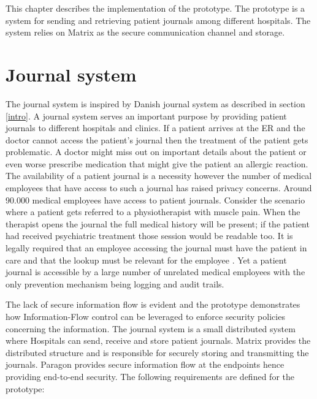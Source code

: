 

This chapter describes the implementation of the prototype. The prototype is a system for sending and retrieving patient journals among different hospitals. The system relies on Matrix as the secure communication channel and storage.


\section{Journal system}


The journal system is inspired by Danish journal system as described in section \ref{intro}. A journal system serves an important purpose by providing patient journals to different hospitals and clinics. If a patient arrives at the ER and the doctor cannot access the patient's journal then the treatment of the patient gets problematic. A doctor might miss out on important details about the patient or even worse prescribe medication that might give the patient an allergic reaction. The availability of a patient journal is a necessity however the number of medical employees that have access to such a journal has raised privacy concerns. Around 90.000 medical employees have access to patient journals. Consider the scenario where a patient gets referred to a physiotherapist with muscle pain. When the therapist opens the journal the full medical history will be present; if the patient had received psychiatric treatment those session would be readable too. It is legally required that an employee accessing the journal must have the patient in care and that the lookup must be relevant for the employee \cite{adgang}\cite{kontrol}. Yet a patient journal is accessible by a large number of unrelated medical employees with the only prevention mechanism being logging and audit trails.


The lack of secure information flow is evident and the prototype demonstrates how Information-Flow control can be leveraged to enforce security policies concerning the information. The journal system is a small distributed system where Hospitals can send, receive and store patient journals. Matrix provides the distributed structure and is responsible for securely storing and transmitting the journals. Paragon provides secure information flow at the endpoints hence providing end-to-end security. 
The following requirements are defined for the prototype:

